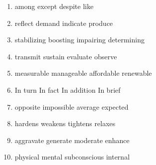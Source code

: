 \newpage

\begin{enumerate}
	\item


\fourchoices
{among}
{except}
{despite}
{like}




\item


\fourchoices
{reflect}
{demand}
{indicate}
{produce}




\item

\fourchoices
{stabilizing}
{boosting}
{impairing}
{determining}




\item


\fourchoices
{transmit}
{sustain}
{evaluate}
{observe}




\item

\fourchoices
{measurable}
{manageable}
{affordable}
{renewable}




\item


\fourchoices
{In turn}
{In fact}
{In addition}
{In brief}




\item


\fourchoices
{opposite}
{impossible}
{average}
{expected}




\item


\fourchoices
{hardens}
{weakens}
{tightens}
{relaxes}




\item


\fourchoices
{aggravate}
{generate}
{moderate}
{enhance}




\item


\fourchoices
{physical}
{mental}
{subconscious}
{internal}





\end{enumerate}
